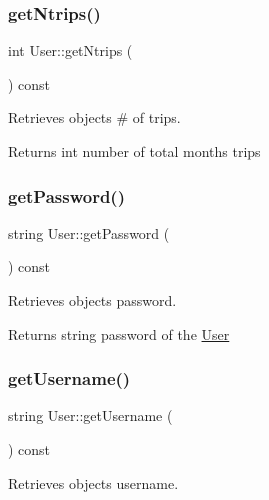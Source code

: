 \subsubsection{\texorpdfstring{get\+Ntrips()}{getNtrips()}}
{\footnotesize\ttfamily int User\+::get\+Ntrips (\begin{DoxyParamCaption}{ }\end{DoxyParamCaption}) const}



Retrieves object\textquotesingle{}s \# of trips. 

\begin{DoxyReturn}{Returns}
int number of total month\textquotesingle{}s trips 
\end{DoxyReturn}
\mbox{\label{group___user_ga33429bdd1253091697a9c5c5e1448bee}} 
\subsubsection{\texorpdfstring{get\+Password()}{getPassword()}}
{\footnotesize\ttfamily string User\+::get\+Password (\begin{DoxyParamCaption}{ }\end{DoxyParamCaption}) const}



Retrieves object\textquotesingle{}s password. 

\begin{DoxyReturn}{Returns}
string password of the \hyperlink{class_user}{User} 
\end{DoxyReturn}
\mbox{\label{group___user_ga82e034043e04b2d750c654c8b2f2ce78}} 
\subsubsection{\texorpdfstring{get\+Username()}{getUsername()}}
{\footnotesize\ttfamily string User\+::get\+Username (\begin{DoxyParamCaption}{ }\end{DoxyParamCaption}) const}



Retrieves object\textquotesingle{}s username. 

